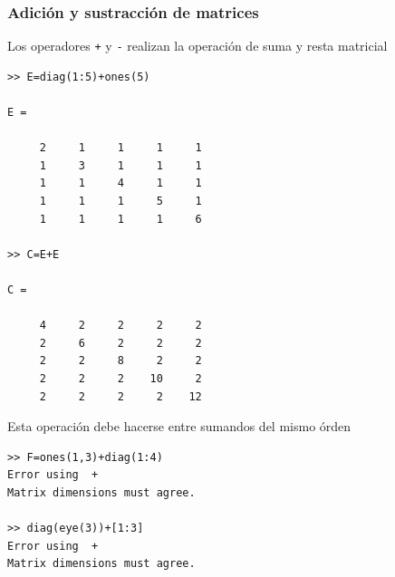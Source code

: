 \documentclass[11pt]{article}
\begin{document}
\subsubsection{Adici\'on y sustracci\'on de matrices}
Los operadores \texttt{+} y \texttt{-} realizan la operaci\'on de suma y resta matricial
\begin{multicols}{2}
\begin{verbatim}
>> E=diag(1:5)+ones(5)

E =

     2     1     1     1     1
     1     3     1     1     1
     1     1     4     1     1
     1     1     1     5     1
     1     1     1     1     6
    
>> C=E+E

C =

     4     2     2     2     2
     2     6     2     2     2
     2     2     8     2     2
     2     2     2    10     2
     2     2     2     2    12
     \end{verbatim}
\end{multicols}
Esta operaci\'on debe hacerse entre sumandos del mismo \'orden
\begin{multicols}{2}
\begin{verbatim}
>> F=ones(1,3)+diag(1:4)
Error using  + 
Matrix dimensions must agree.

>> diag(eye(3))+[1:3]
Error using  + 
Matrix dimensions must agree.    
     \end{verbatim}
\end{multicols}
\end{document}
